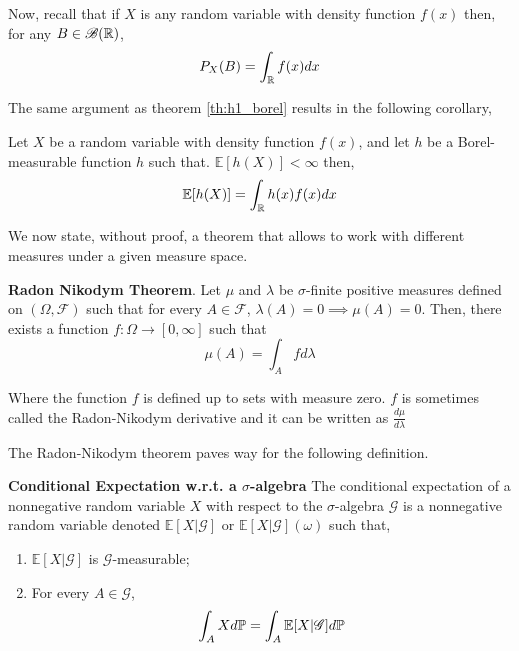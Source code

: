 \documentclass[../TGMAFFIRO.tex]{subfiles}
\begin{document}
Now, recall that if $X$ is any random variable with density function $f(x)$ then, for any $B \in \mathscr{B}(\mathbb{R})$,
\begin{equation*}
	P_X(B) = \int_{\mathbb{R}}  f(x) dx
\end{equation*}

The same argument as theorem \ref{th:h1_borel} results in the following corollary,
\begin{corollary}
	Let $X$ be a random variable with density function $f(x)$, and let $h$ be a Borel-measurable function $h$ such that. $\mathbb{E}[h(X)] < \infty$ then,
	\begin{equation}
		\mathbb{E}[h(X)] = \int_{\mathbb{R}} h(x) f(x) dx
	\end{equation}
\end{corollary}

We now state, without proof, a theorem that allows to work with different measures under a given measure space.

\begin{theorem}\textbf{Radon Nikodym Theorem}.\label{th:radon-nikodym}
Let $\mu$ and $\lambda$ be $\sigma$-finite positive measures defined on $(\Omega, \mathscr{F})$ such that for every $A \in \mathscr{F}$, $\lambda(A) = 0 \implies \mu(A)= 0$. Then, there exists a function $f: \Omega \to [0, \infty]$ such that
\[
	\mu(A) = \int_A f d\lambda
\]

Where the function $f$ is defined up to sets with measure zero. $f$ is sometimes called the Radon-Nikodym derivative and it can be written as $\frac{d\mu}{d\lambda}$
\end{theorem}

The Radon-Nikodym theorem paves way for the following definition.

\begin{definition}\textbf{Conditional Expectation w.r.t. a $\sigma$-algebra}
The conditional expectation of a nonnegative random variable $X$ with respect to the $\sigma$-algebra $\mathscr{G}$ is a nonnegative random variable denoted $\mathbb{E}[X | \mathscr{G}]$ or $\mathbb{E}[X | \mathscr{G}](\omega)$ such that,
\begin{enumerate}
	\item $\mathbb{E}[X | \mathscr{G}]$ is $\mathscr{G}$-measurable;
	\item For every $A \in \mathscr{G}$,
	\[\int_A X d\mathbb{P} = \int_A \mathbb{E}[X | \mathscr{G}] d\mathbb{P}\]
\end{enumerate}

\end{definition}
\end{document}
